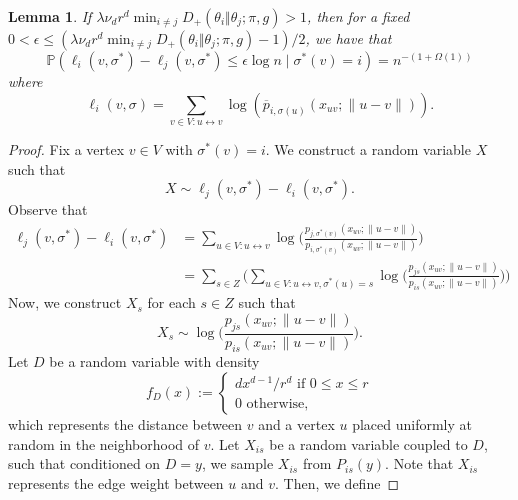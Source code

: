 \documentclass{article}
\renewcommand{\P}{\mathbb{P}}
\newcommand{\1}{\mathbbm{1}}
\newcommand{\visible}{\leftrightarrow{}}
\theoremstyle{definition}
\theoremstyle{plain}
\newtheorem{lemma}{Lemma}
\begin{document}
\begin{lemma}
\label{lem:correct_labels_MAP_failures}
    If $\lambda \nu_d r^d \min_{i \neq j} D_+(\theta_i \Vert \theta_j; \pi, g) > 1$, then for a fixed $0 < \epsilon \leq (\lambda \nu_d r^d \min_{i \neq j} D_+(\theta_i \Vert \theta_j; \pi, g) - 1 ) / 2$, we have that
    \begin{equation*}
        \P(\ell_i(v, \sigma^*) - \ell_j(v, \sigma^*) \leq \epsilon \log n \mid \sigma^*(v) = i) = n^{-(1 + \Omega(1))}
    \end{equation*}
    where
    \begin{equation*}
        \ell_i(v, \sigma) = \sum_{v \in V: u \visible v} \log(\overline{p}_{i, \sigma(u)}(x_{uv};\|u - v\|)).
    \end{equation*}
\end{lemma}
\begin{proof}
    Fix a vertex $v \in V$ with $\sigma^*(v) = i$. We construct a random variable $X$ such that 
    \begin{equation*}
        X \sim \ell_j(v, \sigma^*) - \ell_i(v, \sigma^*).
    \end{equation*}
    Observe that
    \begin{align*}
         \ell_j(v, \sigma^*) - \ell_i(v, \sigma^*) &= \sum_{u \in V: u \visible v} \log\bigg(\frac{p_{j, \sigma^*(v)}(x_{uv}; \|u-v\|)}{p_{i, \sigma^*(v)}(x_{uv}; \|u-v\|)}\bigg) \\
         &= \sum_{s \in Z} \bigg( \sum_{u \in V: u \visible v, \sigma^*(u) = s} \log\Big(\frac{p_{js}(x_{uv}; \|u-v\|)}{p_{is}(x_{uv}; \|u-v\|)}\Big) \bigg)
    \end{align*}
    Now, we construct $X_s$ for each $s \in Z$ such that
    \begin{equation*}
        X_s \sim \log\bigg(\frac{p_{js}(x_{uv}; \|u-v\|)}{p_{is}(x_{uv}; \|u-v\|)}\bigg).
    \end{equation*}
    Let $D$ be a random variable with density
    \begin{equation*}
        f_D(x) :=
        \begin{cases}
            dx^{d-1}/r^d \text{ if } 0 \leq x \leq r \\
            0 \text{ otherwise,} 
        \end{cases}
    \end{equation*}
    which represents the distance between $v$ and a vertex $u$ placed uniformly at random in the neighborhood of $v$. Let $X_{is}$ be a random variable coupled to $D$, such that conditioned on $D = y$, we sample $X_{is}$ from $P_{is}(y)$. Note that $X_{is}$ represents the edge weight between $u$ and $v$. Then, we define

\end{proof}
\end{document}
